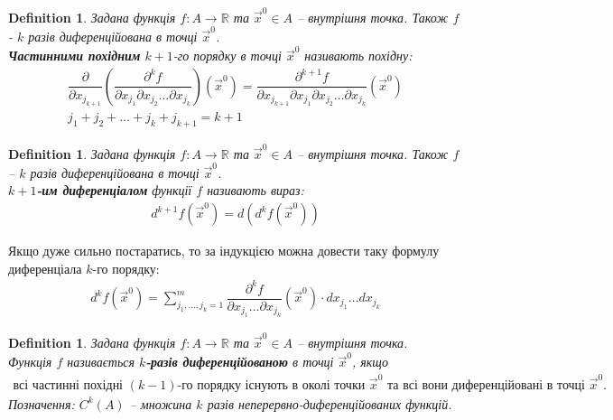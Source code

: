 \documentclass[a4paper, 10pt]{article}
\def\huge{\displaystyle}
\theoremstyle{theoremdd}
\theoremstyle{theoremdd}
\theoremstyle{theoremdd}
\newtheorem{definition}[theorem]{Definition}
\theoremstyle{theoremdd}
\theoremstyle{theoremdd}
\theoremstyle{theoremdd}
\theoremstyle{theoremdd}
\newtheorem{remark}[theorem]{Remark}
\theoremstyle{theoremdd}
\theoremstyle{theoremdd}
\begin{document}
\begin{definition}
Задана функція $f\colon A \to \mathbb{R}$ та $\vec{x}^0 \in A$ -- внутрішня точка. Також $f$ - $k$ разів диференційована в точці $\vec{x}^0$.\\
\textbf{Частинними похідним} $k+1$-го порядку в точці $\vec{x}^0$ називають похідну:
\begin{align*}
\dfrac{\partial}{\partial x_{j_{k+1}}} \left( \dfrac{\partial^k f}{\partial x_{j_1} \partial x_{j_2} \dots \partial x_{j_k}} \right)(\vec{x}^0) = \dfrac{\partial^{k+1} f}{\partial x_{j_{k+1}} \partial x_{j_1} \partial x_{j_2} \dots \partial x_{j_k}}(\vec{x}^0) \\
j_1+j_2+\dots+j_k+j_{k+1} = k+1
\end{align*}
\end{definition}

\begin{definition}
Задана функція $f\colon A \to \mathbb{R}$ та $\vec{x}^0 \in A$ -- внутрішня точка. Також $f$ -- $k$ разів диференційована в точці $\vec{x}^0$.\\
\textbf{$k+1$-им диференціалом} функції $f$ називають вираз:
\begin{align*}
d^{k+1}f(\vec{x}^0) = d(d^k f(\vec{x}^0))
\end{align*}
\end{definition}
Якщо дуже сильно постаратись, то за індукцією можна довести таку формулу диференціала $k$-го порядку:
\begin{align*}
d^{k} f(\vec{x}^0) = \huge\sum_{j_1,\dots,j_k=1}^m \dfrac{\partial^k f}{\partial x_{j_1}\dots \partial x_{j_k}} (\vec{x}^0) \cdot dx_{j_1} \dots dx_{j_k}
\end{align*}

\begin{definition}
Задана функція $f\colon A \to \mathbb{R}$ та $\vec{x}^0 \in A$ -- внутрішня точка.\\
Функція $f$ називається \textbf{$k$-разів диференційованою} в точці $\vec{x}^0$, якщо
\begin{align*}
\text{всі частинні похідні $(k-1)$-го порядку існують в околі точки $\vec{x}^0$ та всі вони диференційовані в точці $\vec{x}^0$.}
\end{align*}
Позначення: $C^k(A)$ -- множина $k$ разів неперервно-диференційованих функцій.
\end{definition}
\end{document}
